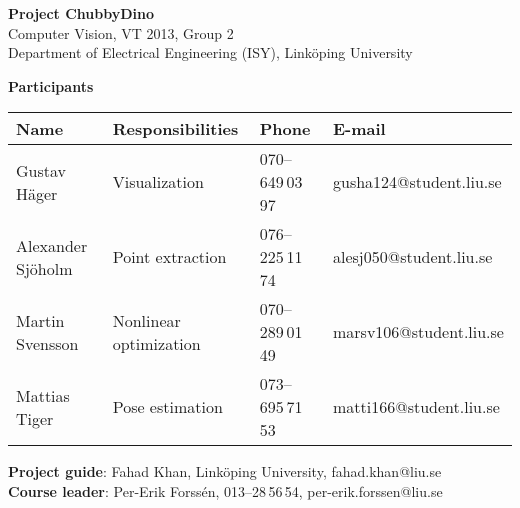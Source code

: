 \begin{center}
    \vspace*{4\baselineskip}

	\textbf{\huge Project ChubbyDino} \\
	\vspace*{0.5\baselineskip}
	Computer Vision, VT 2013, Group 2 \\
	Department of Electrical Engineering (ISY), Link\"{o}ping University
	
	\vspace*{2\baselineskip}
	\textbf{\LARGE Participants}


	{\footnotesize 
	\begin{tabular}{|p{2.7cm}|p{5cm}|p{2cm}|p{3.4cm}|}
		\hline
			\textbf{Name} & \textbf{Responsibilities} & \textbf{Phone} & \textbf{E-mail} \\
		\hline
		Gustav Häger & Visualization & 070--649\,03\,97 & gusha124@student.liu.se \\
		\hline
		Alexander Sjöholm & Point extraction & 076--225\,11\,74 & alesj050@student.liu.se \\
		\hline
		Martin Svensson & Nonlinear optimization & 070--289\,01\,49 & marsv106@student.liu.se \\
		\hline
		Mattias Tiger & Pose estimation & 073--695\,71\,53 & matti166@student.liu.se \\
		\hline
	\end{tabular}
	}

{\footnotesize 

\vspace{1\baselineskip}

\textbf{Project guide}: Fahad Khan, Link\"{o}ping University, fahad.khan@liu.se \\
\textbf{Course leader}: Per-Erik Forssén, 013--28\,56\,54, per-erik.forssen@liu.se \\
}

\end{center}
